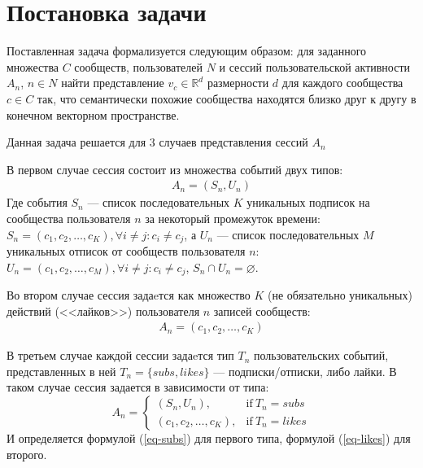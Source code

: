 \documentclass[times,specification,annotation]{itmo-student-thesis}
\begin{document}


\section{Постановка задачи}\label{sec:intro}

Поставленная задача формализуется следующим образом: для заданного множества $C$ сообществ, пользователей $N$ и сессий пользовательской активности $A_n$, $n \in N$ найти представление $v_{c} \in \mathbb{R}^d$ размерности $d$ для каждого сообщества $c \in C$ так, что семантически похожие сообщества находятся близко друг к другу в конечном векторном пространстве. 

Данная задача решается для 3 случаев представления сессий $A_n$
 
В первом случае сессия состоит из множества событий двух типов:
 \begin{align}
A_n = (S_n, U_n) 
\label{eq-subs}
\end{align}
Где события $S_n$ --- список последовательных $K$ уникальных подписок на сообщества пользователя $n$ за некоторый промежуток времени: $S_n = (c_{1}, c_{2}, \dots, c_{K}), \forall i \ne j : c_i \ne c_j$, а $U_n$ --- список последовательных $M$ уникальных отписок от сообществ пользователя $n$: $U_n = (c_{1},  c_{2}, \dots, c_{M}), \forall i \ne j : c_i \ne c_j$, $S_n \cap U_n = \varnothing$.

Во втором случае сессия задаeтся как множество $K$ (не обязательно уникальных) действий (<<лайков>>) пользователя $n$ записей сообществ:
 \begin{align}
A_n = (c_{1}, c_{2}, \dots, c_{K}) 
\label{eq-likes}
\end{align}
 
В третьем случае каждой сессии задаeтся тип $T_n$ пользовательских событий, представленных в ней $T_n = \{subs, likes\}$ --- подписки/отписки, либо лайки. В таком случае сессия задается в зависимости от типа:
\begin{equation}
    A_n =
    \begin{cases}
      (S_n, U_n), & \text{if}\ T_n=subs \\
      (c_{1}, c_{2}, \dots, c_{K}), & \text{if}\ T_n=likes
    \end{cases}  
    \label{eq-combined}
  \end{equation}
 И определяется формулой (\ref{eq-subs}) для первого типа, формулой (\ref{eq-likes}) для второго.
\end{document}
